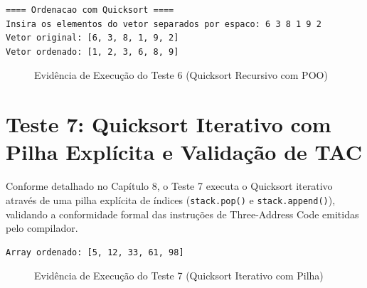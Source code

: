 \begin{lstlisting}[language=bash, caption={Execucao interativa do Quicksort Recursivo com POO (Teste 6)}]
==== Ordenacao com Quicksort ====
Insira os elementos do vetor separados por espaco: 6 3 8 1 9 2
Vetor original: [6, 3, 8, 1, 9, 2]
Vetor ordenado: [1, 2, 3, 6, 8, 9]
\end{lstlisting}

\begin{figure}[htbp]
    \centering
    \caption{Evidência de Execução do Teste 6 (Quicksort Recursivo com POO)}
    \label{fig:teste6_print}
\end{figure}

\section{Teste 7: Quicksort Iterativo com Pilha Explícita e Validação de TAC}
Conforme detalhado no Capítulo 8, o Teste 7 executa o Quicksort iterativo através de uma pilha explícita de índices (\texttt{stack.pop()} e \texttt{stack.append()}), validando a conformidade formal das instruções de Three-Address Code emitidas pelo compilador.

\begin{lstlisting}[language=bash, caption={Saida do Quicksort Iterativo com Pilha (Teste 7)}]
Array ordenado: [5, 12, 33, 61, 98]
\end{lstlisting}

\begin{figure}[htbp]
    \centering
    \caption{Evidência de Execução do Teste 7 (Quicksort Iterativo com Pilha)}
    \label{fig:teste7_print}
\end{figure}

